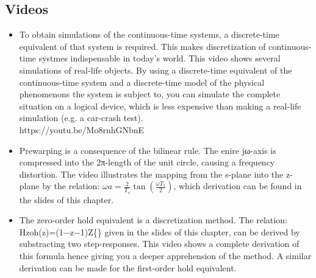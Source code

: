 \documentclass{document}
\begin{document}
		\subsection{Videos}
		\begin{itemize}
			\item 	To obtain simulations of the continuous-time systems, a discrete-time equivalent of that system is required. This makes discretization of continuous-time systmes indispensable in today's world. This video shows several simulations of real-life objects. By using a discrete-time equivalent of the continuous-time system and a discrete-time model of the physical phenomenons the system is subject to, you can simulate the complete situation on a logical device, which is less expensive than making a real-life simulation (e.g. a car-crash test).\\
			https://youtu.be/Mo8rnhGNbnE
			\item Prewarping is a consequence of the bilinear rule. The enire jω-axis is compressed into the 2π-length of the unit circle, causing a frequency distortion. The video illustrates the mapping from the s-plane into the z-plane by the relation: $\omega a=\frac{2}{T_s}\tan(\frac{\omega T_s}{2})$, which derivation can be found in the slides of this chapter.\\
			\item The zero-order hold equivalent is a discretization method. The relation: Hzoh(z)=(1−z−1)Z\{\} given in the slides of this chapter, can be derived by substracting two step-responses. This video shows a complete derivation of this formula hence giving you a deeper apprehension of the method. A similar derivation can be made for the first-order hold equivalent.
		\end{itemize}
\end{document}
